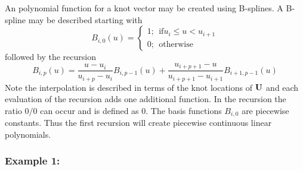 An polynomial function for a knot vector may be created using
B-splines.  A B-spline may be described
starting with
\begin{displaymath}
B_{i,0}(u) = \left\{ \begin{array}{l}
1; ~~ \text{if} u_i \le u < u_{i+1} \\
0; ~~ \text{otherwise}
\end{array} \right.
\end{displaymath}
followed by the recursion
\begin{displaymath}
B_{i,p}(u) = \dfrac{u - u_i}{u_{i+p} - u_i} B_{i,p-1}(u)
+ \dfrac{u_{i+p+1} - u}{u_{i+p+1} - u_{i+1}} B_{i+1,p-1}(u)
\end{displaymath}
Note the interpolation is described in terms of the knot locations of
$\mathbf{U}$ and each evaluation of the recursion adds one additional
function. In the recursion the ratio $0/0$ can occur and is defined
as $0$.
The basis functions $B_{i,0}$ are piecewise constants.  Thus the first
recursion will create piecewise continuous linear polynomials.

\subsubsection{Example 1:}

